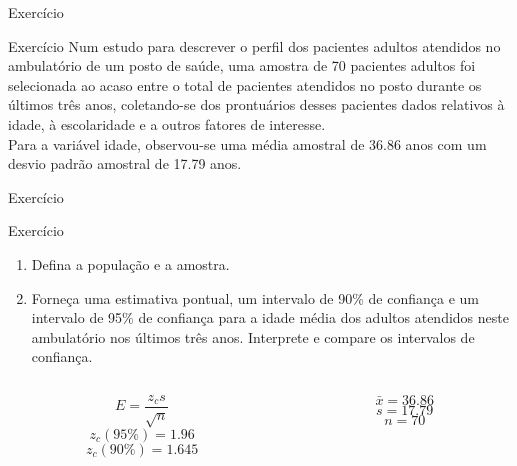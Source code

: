 \documentclass{beamer}
\begin{document}
\begin{frame}{Exercício}
  \begin{block}{Exercício}
    Num estudo para descrever o perfil dos pacientes adultos atendidos
    no ambulatório de um posto de saúde, uma amostra de 70 pacientes
    adultos foi selecionada ao acaso entre o total de pacientes
    atendidos no posto durante os últimos três anos, coletando-se dos
    prontuários desses pacientes dados relativos à idade, à
    escolaridade e a outros fatores de interesse.\\

    Para a variável idade, observou-se uma média amostral de 36.86
    anos com um desvio padrão amostral de 17.79 anos.
  \end{block}
\end{frame}

\begin{frame}{Exercício}
  \begin{block}{Exercício}
    \begin{enumerate}
    \item Defina a população e a amostra.
    \item Forneça uma estimativa pontual, um intervalo de 90\% de
      confiança e um intervalo de 95\% de confiança para a idade média
      dos adultos atendidos neste ambulatório nos últimos três
      anos. Interprete e compare os intervalos de confiança.
    \end{enumerate}
  \end{block}

  \begin{block}{}
    \begin{columns}
      \begin{column}{5cm}
    \begin{displaymath}
      E = \frac{z_c s}{\sqrt{n}}
    \end{displaymath}
    \begin{displaymath}
      z_c (95\%) = 1.96
    \end{displaymath}
    \begin{displaymath}
      z_c (90\%) = 1.645
    \end{displaymath}
  \end{column}
  \begin{column}{5cm}
    \begin{displaymath}
      \bar{x} = 36.86
    \end{displaymath}
    \begin{displaymath}
      s = 17.79
    \end{displaymath}
    \begin{displaymath}
      n = 70
    \end{displaymath}
  \end{column}
\end{columns}
\end{block}
\end{frame}
\end{document}
